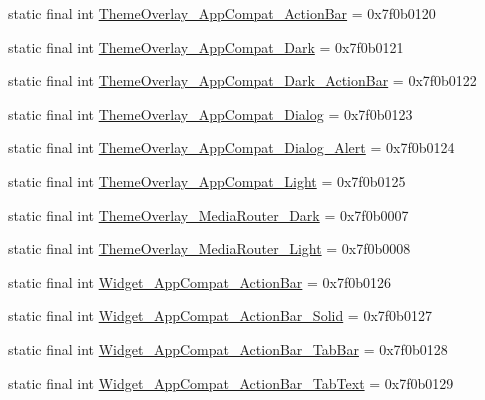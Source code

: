 \begin{CompactItemize}
static final int \hyperlink{classandroid_1_1support_1_1v7_1_1cardview_1_1_r_1_1style_2b42042f9b9b4de95a1267c83aa8e193}{ThemeOverlay\_\-AppCompat\_\-ActionBar} = 0x7f0b0120
\item 
static final int \hyperlink{classandroid_1_1support_1_1v7_1_1cardview_1_1_r_1_1style_77f6ac3513950cbe383c79c3fdcb5bb3}{ThemeOverlay\_\-AppCompat\_\-Dark} = 0x7f0b0121
\item 
static final int \hyperlink{classandroid_1_1support_1_1v7_1_1cardview_1_1_r_1_1style_4b703cf42006fdefe751a2dab65ea334}{ThemeOverlay\_\-AppCompat\_\-Dark\_\-ActionBar} = 0x7f0b0122
\item 
static final int \hyperlink{classandroid_1_1support_1_1v7_1_1cardview_1_1_r_1_1style_4b354a978c021be1849c4359fe968a74}{ThemeOverlay\_\-AppCompat\_\-Dialog} = 0x7f0b0123
\item 
static final int \hyperlink{classandroid_1_1support_1_1v7_1_1cardview_1_1_r_1_1style_79dacae9eac9a8efd27ee2776e26abd4}{ThemeOverlay\_\-AppCompat\_\-Dialog\_\-Alert} = 0x7f0b0124
\item 
static final int \hyperlink{classandroid_1_1support_1_1v7_1_1cardview_1_1_r_1_1style_29b684c9a758492ef57bfb4166550fdb}{ThemeOverlay\_\-AppCompat\_\-Light} = 0x7f0b0125
\item 
static final int \hyperlink{classandroid_1_1support_1_1v7_1_1cardview_1_1_r_1_1style_6a843fdcea4172732e7527464055a770}{ThemeOverlay\_\-MediaRouter\_\-Dark} = 0x7f0b0007
\item 
static final int \hyperlink{classandroid_1_1support_1_1v7_1_1cardview_1_1_r_1_1style_e7e43c900f827b8952b58f535570ff7d}{ThemeOverlay\_\-MediaRouter\_\-Light} = 0x7f0b0008
\item 
static final int \hyperlink{classandroid_1_1support_1_1v7_1_1cardview_1_1_r_1_1style_35f05f74262c0b201f107661eb4bf050}{Widget\_\-AppCompat\_\-ActionBar} = 0x7f0b0126
\item 
static final int \hyperlink{classandroid_1_1support_1_1v7_1_1cardview_1_1_r_1_1style_0775174f6c81198c4dd21283f34f0264}{Widget\_\-AppCompat\_\-ActionBar\_\-Solid} = 0x7f0b0127
\item 
static final int \hyperlink{classandroid_1_1support_1_1v7_1_1cardview_1_1_r_1_1style_42be518172e1ab3062af386ad56f718b}{Widget\_\-AppCompat\_\-ActionBar\_\-TabBar} = 0x7f0b0128
\item 
static final int \hyperlink{classandroid_1_1support_1_1v7_1_1cardview_1_1_r_1_1style_511355c18b80c8978bb070b7a221625b}{Widget\_\-AppCompat\_\-ActionBar\_\-TabText} = 0x7f0b0129
\item 

\end{CompactItemize}
